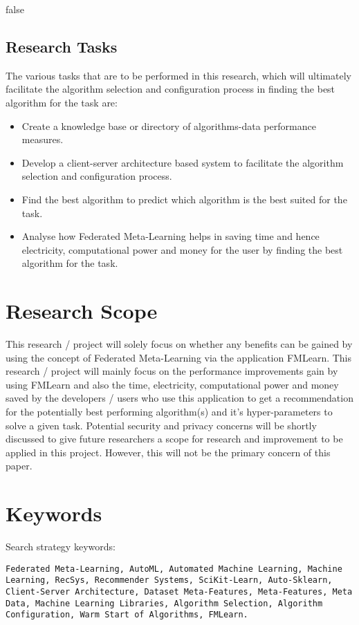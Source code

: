 \if false

\subsection{Research Tasks}
The various tasks that are to be performed in this research, which will ultimately facilitate the algorithm selection and configuration process in finding the best algorithm for the task are:

\begin{itemize}
    \item Create a knowledge base or directory of algorithms-data performance measures.
    \item Develop a client-server architecture based system to facilitate the algorithm selection and configuration process.
    \item Find the best algorithm to predict which algorithm is the best suited for the task.
    \item Analyse how Federated Meta-Learning helps in saving time and hence electricity, computational power and money for the user by finding the best algorithm for the task.
\end{itemize}


\section{Research Scope}
This research / project will solely focus on whether any benefits can be gained by using the concept of Federated Meta-Learning via the application FMLearn. This research / project will mainly focus on the performance improvements gain by using FMLearn and also the time, electricity, computational power and money saved by the developers / users who use this application to get a recommendation for the potentially best performing algorithm(s) and it's hyper-parameters to solve a given task. Potential security and privacy concerns will be shortly discussed to give future researchers a scope for research and improvement to be applied in this project. However, this will not be the primary concern of this paper.

\section{Keywords}
Search strategy keywords:

\texttt{Federated Meta-Learning, AutoML, Automated Machine Learning, Machine Learning, RecSys, Recommender Systems, SciKit-Learn, Auto-Sklearn, Client-Server Architecture, Dataset Meta-Features, Meta-Features, Meta Data, Machine Learning Libraries, Algorithm Selection, Algorithm Configuration, Warm Start of Algorithms, FMLearn.}

\fi